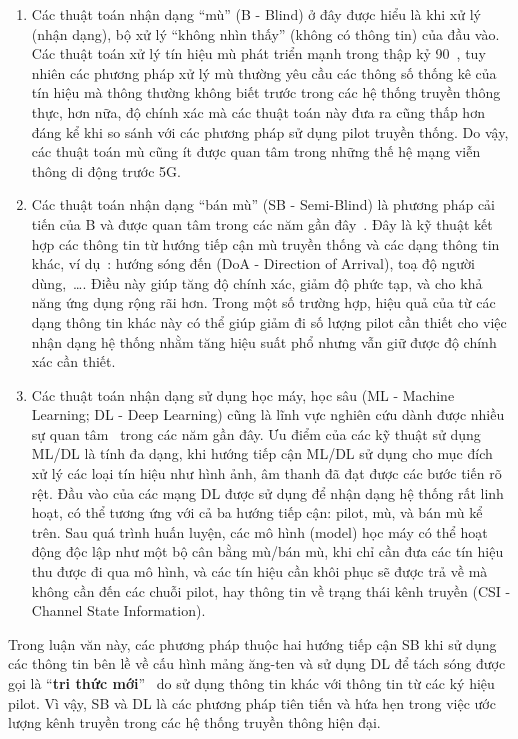 \begin{enumerate}
    \item Các thuật toán nhận dạng ``mù'' (B - Blind) ở đây được hiểu là khi xử lý (nhận dạng), bộ xử lý ``không nhìn thấy'' (không có thông tin) của đầu vào. Các thuật toán xử lý tín hiệu mù phát triển mạnh trong thập kỷ 90~\cite{abed1997}, tuy nhiên các phương pháp xử lý mù thường yêu cầu các thông số thống kê của tín hiệu mà thông thường không biết trước trong các hệ thống truyền thông thực, hơn nữa, độ chính xác mà các thuật toán này đưa ra cũng thấp hơn đáng kể khi so sánh với các phương pháp sử dụng pilot truyền thống. Do vậy, các thuật toán mù cũng ít được quan tâm trong những thế hệ mạng viễn thông di động trước 5G.

    \item Các thuật toán nhận dạng ``bán mù'' (SB - Semi-Blind) là phương pháp cải tiến của B và được quan tâm trong các năm gần đây~\cite{Ladaycia2017, Ladaycia2019, shaik2021}. Đây là kỹ thuật kết hợp các thông tin từ hướng tiếp cận mù truyền thống 
    và các dạng thông tin khác, ví dụ~\cite{Rekik2021}: hướng sóng đến (DoA - Direction of Arrival), toạ độ người dùng,~\ldots. Điều này giúp tăng độ chính xác, giảm độ phức tạp, và cho khả năng ứng dụng rộng rãi hơn. Trong một số trường hợp, hiệu quả của từ các dạng thông tin khác này có thể giúp giảm đi số lượng pilot cần thiết cho việc nhận dạng hệ thống nhằm tăng hiệu suất phổ nhưng vẫn giữ được độ chính xác cần thiết.

    \item Các thuật toán nhận dạng sử dụng học máy, học sâu (ML - Machine Learning; DL - Deep Learning) cũng là lĩnh vực nghiên cứu dành được nhiều sự quan tâm~\cite{Zhang2019} trong các năm gần đây. Ưu điểm của các kỹ thuật sử dụng ML/DL là tính đa dạng, khi hướng tiếp cận ML/DL sử dụng cho mục đích xử lý các loại tín hiệu như hình ảnh, âm thanh đã đạt được các bước tiến rõ rệt. Đầu vào của các mạng DL được sử dụng để nhận dạng hệ thống rất linh hoạt, có thể tương ứng với cả ba hướng tiếp cận: pilot, mù, và bán mù kể trên. Sau quá trình huấn luyện, các mô hình (model) học máy có thể hoạt động độc lập như một bộ cân bằng mù/bán mù, khi chỉ cần đưa các tín hiệu thu được đi qua mô hình, và các tín hiệu cần khôi phục sẽ được trả về mà không cần đến các chuỗi pilot, hay thông tin về trạng thái kênh truyền (CSI - Channel State Information).
\end{enumerate}

Trong luận văn này, các phương pháp thuộc hai hướng tiếp cận SB khi sử dụng các thông tin bên lề về cấu hình mảng ăng-ten và sử dụng DL để tách sóng được gọi là ``\textbf{tri thức mới}''~\cite{InSI} do sử dụng thông tin khác với thông tin từ các ký hiệu pilot.
Vì vậy, SB và DL là các phương pháp tiên tiến và hứa hẹn trong việc ước lượng kênh truyền trong các hệ thống truyền thông hiện đại.

